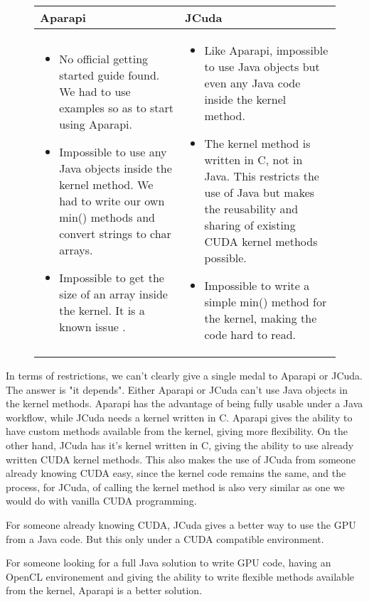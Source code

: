 \begin{figure}[H]
\begin{tabularx}{\textwidth}{@{}Y|Y@{}}
	\textbf{Aparapi} & \textbf{JCuda} \\
	\hline \hline
	 
	 \begin{itemize}
	   \item
	   No official getting started guide found. We had to use examples so as to start using Aparapi.
       \item 
       Impossible to use any Java objects inside the kernel method. We had to write our own min() methods and convert strings to char arrays. 
       \item
       Impossible to get the size of an array inside the kernel. It is a known issue \cite{aparapibug}.
     \end{itemize} 
     
     &

	 \begin{itemize}
       \item Like Aparapi, impossible to use Java objects but even any Java code inside the kernel method.
       \item The kernel method is written in C, not in Java. This restricts the use of Java but makes the reusability and sharing of existing CUDA kernel methods possible.
       \item Impossible to write a simple min() method for the kernel, making the code hard to read.
     \end{itemize} \\

	\hline
	
\end{tabularx}
\end{figure}
\renewcommand{\arraystretch}{1}

In terms of restrictions, we can't clearly give a single medal to Aparapi or JCuda. The answer is "it depends". Either Aparapi or JCuda can't use Java objects in the kernel methods. Aparapi has the advantage of being fully usable under a Java workflow, while JCuda needs a kernel written in C. Aparapi gives the ability to have custom methods available from the kernel, giving more flexibility. On the other hand, JCuda has it's kernel written in C, giving the ability to use already written CUDA kernel methods. This also makes the use of JCuda from someone already knowing CUDA easy, since the kernel code remains the same, and the process, for JCuda, of calling the kernel method is also very similar as one we would do with vanilla CUDA programming.

For someone already knowing CUDA, JCuda gives a better way to use the GPU from a Java code. But this only under a CUDA compatible environment.

For someone looking for a full Java solution to write GPU code, having an OpenCL environement and giving the ability to write flexible methods available from the kernel, Aparapi is a better solution.